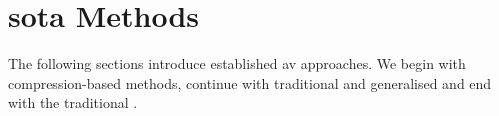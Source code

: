 \section{\Acl{sota} Methods}

The following sections introduce established \ac{av} approaches.
We begin with compression-based methods, continue with traditional and generalised \unmasking{} and end with the traditional \impAppr{}.




  
